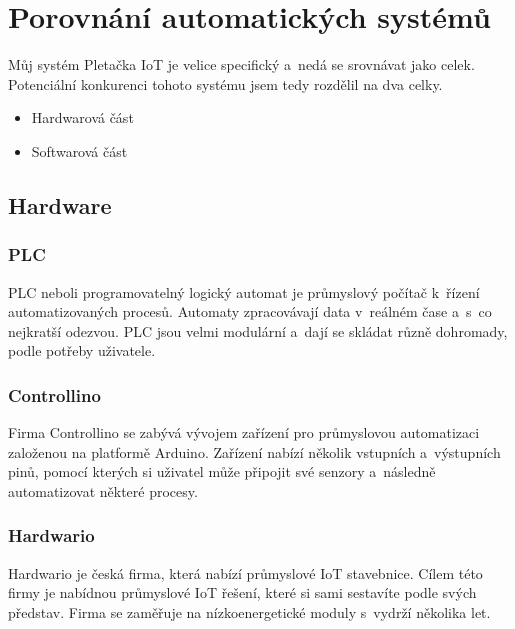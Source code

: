 \chapter{Porovnání automatických systémů}
Můj systém Pletačka IoT je velice specifický a~nedá se srovnávat jako celek. 
Potenciální konkurenci tohoto systému jsem tedy rozdělil na dva celky.

\begin{itemize} %
    \item Hardwarová část
    \item Softwarová část
\end{itemize}



\section{Hardware}

\subsection{PLC}
PLC neboli programovatelný logický automat je průmyslový počítač k~řízení automatizovaných procesů.
Automaty zpracovávají data v~reálném čase a~s~co nejkratší odezvou.
PLC jsou velmi modulární a~dají se skládat různě dohromady, podle potřeby uživatele.



\subsection{Controllino}
Firma Controllino\cite{CONTROLLINO} se zabývá vývojem zařízení pro průmyslovou automatizaci založenou na platformě Arduino.
Zařízení nabízí několik vstupních a~výstupních pinů, pomocí kterých si uživatel může připojit své senzory a~následně automatizovat některé procesy. 




\subsection{Hardwario}
Hardwario\cite{HARDWARIO} je česká firma, která nabízí průmyslové IoT stavebnice.
Cílem této firmy je nabídnou průmyslové IoT řešení, které si sami sestavíte podle svých představ.
Firma se zaměřuje na nízkoenergetické moduly s~vydrží několika let.



